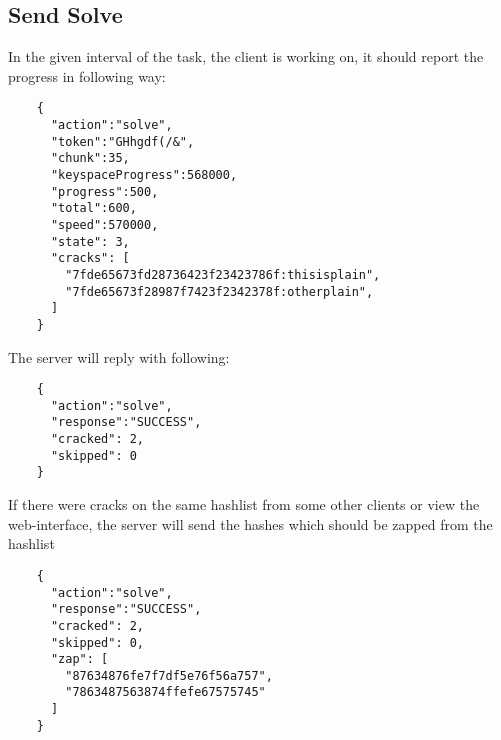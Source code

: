 \documentclass{article}
\begin{document}
	\subsection*{Send Solve}
	In the given interval of the task, the client is working on, it should report the progress in following way:
	\begin{verbatim}
	{
	  "action":"solve",
	  "token":"GHhgdf(/&",
	  "chunk":35,
	  "keyspaceProgress":568000,
	  "progress":500,
	  "total":600,
	  "speed":570000,
	  "state": 3,
	  "cracks": [
	    "7fde65673fd28736423f23423786f:thisisplain",
	    "7fde65673f28987f7423f2342378f:otherplain",
	  ]
	}
	\end{verbatim}
	The server will reply with following:
	\begin{verbatim}
	{
	  "action":"solve",
	  "response":"SUCCESS",
	  "cracked": 2,
	  "skipped": 0
	}
	\end{verbatim}
	If there were cracks on the same hashlist from some other clients or view the web-interface, the server will send the hashes which should be zapped from the hashlist
	\begin{verbatim}
	{
	  "action":"solve",
	  "response":"SUCCESS",
	  "cracked": 2,
	  "skipped": 0,
	  "zap": [
	    "87634876fe7f7df5e76f56a757",
	    "7863487563874ffefe67575745"
	  ]
	}
	\end{verbatim}
\end{document}
